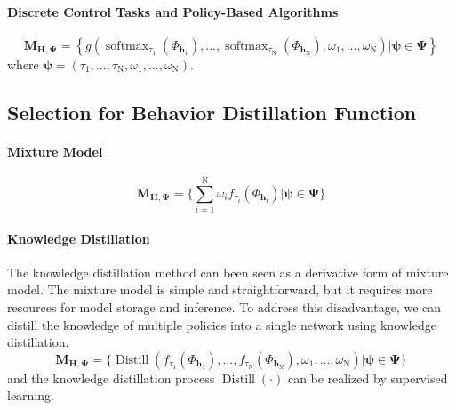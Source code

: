 \paragraph{Discrete Control Tasks and Policy-Based Algorithms}
\begin{equation}
\mathbf{M}_{\mathbf{H},\bm{\Psi}} = \left\{ g\left( \operatorname{softmax}_{\tau_1}(\Phi_{\mathbf{h}_1}),...,\operatorname{softmax}_{\tau_{\mathrm{N}}}(\Phi_{\mathbf{h}_{\mathrm{N}}}),\omega_1,...,\omega_{\mathrm{N}} \right) | \bm{\psi}\in\bm{\Psi} \right\}
\end{equation}
where $\bm{\psi}=(\tau_1,...,\tau_{\mathrm{N}},\omega_1,...,\omega_{\mathrm{N}})$.

\subsection{Selection for Behavior Distillation Function}
\paragraph{Mixture Model}
\begin{equation}
\mathbf{M}_{\mathbf{H},\bm{\Psi}} = \{ \sum_{i=1}^{\mathrm{N}} \omega_i f_{\tau_i}  (\Phi_{\mathbf{h}_i}) | \bm{\psi}\in\bm{\Psi} \}
\end{equation}

\paragraph{Knowledge Distillation}
The knowledge distillation method can been seen as a  derivative form of mixture model. The mixture model is simple and straightforward, but it requires more resources for model storage and inference. To address this disadvantage, we can distill the knowledge of multiple policies into a single network using knowledge distillation.
\begin{equation}
\mathbf{M}_{\mathbf{H},\bm{\Psi}} = \{ \operatorname{Distill}(f_{\tau_1} (\Phi_{\mathbf{h}_1}),..., f_{\tau_{\mathrm{N}}}( \Phi_{\mathbf{h}_{\mathrm{N}}}), \omega_1,...,\omega_{\mathrm{N}}) | \bm{\psi}\in\bm{\Psi} \}
\end{equation}
and the knowledge distillation process $\operatorname{Distill}(\cdot)$ can be realized by supervised learning.

